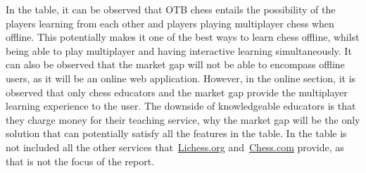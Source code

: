 In the table, it can be observed that OTB chess entails the possibility of the players learning from each other and
players playing multiplayer chess when offline.
This potentially makes it one of the best ways to learn chess offline,
whilst being able to play multiplayer and having interactive learning simultaneously.
It can also be observed that the market gap will not be able to encompass offline users, as it will be an online web
application.
However, in the online section, it is observed that only chess educators and the market gap provide the multiplayer
learning experience to the user.
The downside of knowledgeable educators is that they charge money for their teaching service, why the market gap will be
the only solution that can potentially satisfy all the features in the table.
In the table is not included all the other services that~\url{Lichess.org} and~\url{Chess.com} provide, as that is not
the focus of the report.

